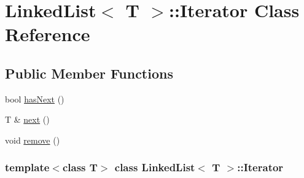 \hypertarget{class_linked_list_1_1_iterator}{
\section{LinkedList$<$ T $>$::Iterator Class Reference}
\label{class_linked_list_1_1_iterator}
}
\subsection*{Public Member Functions}
\begin{DoxyCompactItemize}
\item 
bool \hyperlink{class_linked_list_1_1_iterator_a1ce93392129927a71250c6ca367cf1bd}{hasNext} ()
\item 
T \& \hyperlink{class_linked_list_1_1_iterator_ad8ad5dd4b14cd6dcb848d085bc061d8d}{next} ()
\item 
void \hyperlink{class_linked_list_1_1_iterator_a36832ccc5473db2ffee78e58447130b8}{remove} ()
\end{DoxyCompactItemize}
\subsubsection*{template$<$class T$>$ class LinkedList$<$ T $>$::Iterator}



